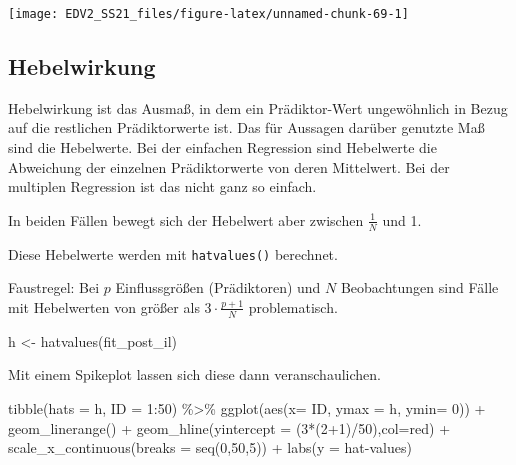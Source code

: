 \documentclass[
]{book}
\newenvironment{Shaded}{\begin{snugshade}}{\end{snugshade}}
\newcommand{\AttributeTok}[1]{\textcolor[rgb]{0.77,0.63,0.00}{#1}}
\newcommand{\DecValTok}[1]{\textcolor[rgb]{0.00,0.00,0.81}{#1}}
\newcommand{\FunctionTok}[1]{\textcolor[rgb]{0.00,0.00,0.00}{#1}}
\newcommand{\NormalTok}[1]{#1}
\newcommand{\OtherTok}[1]{\textcolor[rgb]{0.56,0.35,0.01}{#1}}
\newcommand{\SpecialCharTok}[1]{\textcolor[rgb]{0.00,0.00,0.00}{#1}}
\newcommand{\StringTok}[1]{\textcolor[rgb]{0.31,0.60,0.02}{#1}}
\begin{document}
\begin{center}\texttt{[image: EDV2\_SS21\_files/figure-latex/unnamed-chunk-69-1]} \end{center}

\hypertarget{hebelwirkung}{%
\subsection{Hebelwirkung}\label{hebelwirkung}}

Hebelwirkung ist das Ausmaß, in dem ein Prädiktor-Wert ungewöhnlich in Bezug auf die restlichen Prädiktorwerte ist. Das für Aussagen darüber genutzte Maß sind die Hebelwerte.
Bei der einfachen Regression sind Hebelwerte die Abweichung der einzelnen Prädiktorwerte von deren Mittelwert. Bei der multiplen Regression ist das nicht ganz so einfach.

In beiden Fällen bewegt sich der Hebelwert aber zwischen \(\frac{1}{N}\) und 1.

Diese Hebelwerte werden mit \texttt{hatvalues()} berechnet.

Faustregel: Bei \(p\) Einflussgrößen (Prädiktoren) und \(N\) Beobachtungen sind Fälle mit Hebelwerten von größer als \(3 \cdot \frac{p+1}N\) problematisch.

\begin{Shaded}
\begin{Highlighting}[]
\NormalTok{h }\OtherTok{\textless{}{-}} \FunctionTok{hatvalues}\NormalTok{(fit\_post\_il)}
\end{Highlighting}
\end{Shaded}

Mit einem Spikeplot lassen sich diese dann veranschaulichen.

\begin{Shaded}
\begin{Highlighting}[]
\FunctionTok{tibble}\NormalTok{(}\AttributeTok{hats =}\NormalTok{ h,}
       \AttributeTok{ID =} \DecValTok{1}\SpecialCharTok{:}\DecValTok{50}\NormalTok{) }\SpecialCharTok{\%\textgreater{}\%} 
  \FunctionTok{ggplot}\NormalTok{(}\FunctionTok{aes}\NormalTok{(}\AttributeTok{x=}\NormalTok{ ID, }\AttributeTok{ymax =}\NormalTok{ h, }\AttributeTok{ymin=} \DecValTok{0}\NormalTok{)) }\SpecialCharTok{+}
  \FunctionTok{geom\_linerange}\NormalTok{() }\SpecialCharTok{+}
  \FunctionTok{geom\_hline}\NormalTok{(}\AttributeTok{yintercept =}\NormalTok{ (}\DecValTok{3}\SpecialCharTok{*}\NormalTok{(}\DecValTok{2}\SpecialCharTok{+}\DecValTok{1}\NormalTok{)}\SpecialCharTok{/}\DecValTok{50}\NormalTok{),}\AttributeTok{col=}\StringTok{\textquotesingle{}red\textquotesingle{}}\NormalTok{) }\SpecialCharTok{+}
  \FunctionTok{scale\_x\_continuous}\NormalTok{(}\AttributeTok{breaks =} \FunctionTok{seq}\NormalTok{(}\DecValTok{0}\NormalTok{,}\DecValTok{50}\NormalTok{,}\DecValTok{5}\NormalTok{)) }\SpecialCharTok{+}
  \FunctionTok{labs}\NormalTok{(}\AttributeTok{y =} \StringTok{\textquotesingle{}hat{-}values\textquotesingle{}}\NormalTok{)}
\end{Highlighting}
\end{Shaded}
\end{document}
